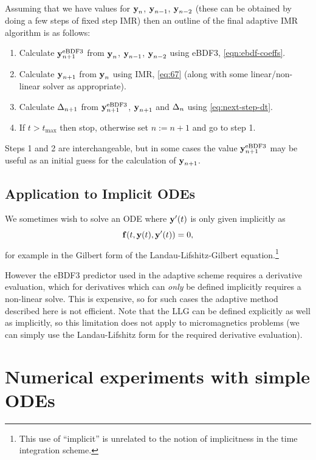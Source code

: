 Assuming that we have values for $\boldsymbol{\mathrm{y}}_n$, $\boldsymbol{\mathrm{y}}_{n-1}$, $\boldsymbol{\mathrm{y}}_{n-2}$ (these can be obtained \eg by doing a few steps of fixed step IMR) then an outline of the final adaptive IMR algorithm is as follows:
\begin{enumerate}
\item Calculate $\boldsymbol{\mathrm{y}}_{n+1}^{\mathrm{eBDF3}}$ from $\boldsymbol{\mathrm{y}}_n$, $\boldsymbol{\mathrm{y}}_{n-1}$, $\boldsymbol{\mathrm{y}}_{n-2}$ using eBDF3, \cref{eqn:ebdf-coeffs}.
\item Calculate $\boldsymbol{\mathrm{y}}_{n+1}$ from $\boldsymbol{\mathrm{y}}_n$ using IMR, \cref{eq:67} (along with some linear/non-linear solver as appropriate).
\item Calculate $\Delta_{n+1}$ from $\boldsymbol{\mathrm{y}}_{n+1}^{\mathrm{eBDF3}}$, $\boldsymbol{\mathrm{y}}_{n+1}$ and $\Delta_{n}$ using
  \cref{eq:next-step-dt}.
\item If $t > t_{\text{max}}$ then stop, otherwise set $n := n+1$ and go to step 1.
\end{enumerate}

Steps 1 and 2 are interchangeable, but in some cases the value $\boldsymbol{\mathrm{y}}_{n+1}^{\mathrm{eBDF3}}$ may be useful as an initial guess for the calculation of $\boldsymbol{\mathrm{y}}_{n+1}$.


\subsection{Application to Implicit ODEs}
\label{sec:extens-impl-odes}

We sometimes wish to solve an ODE where $\boldsymbol{\mathrm{y}}'(t)$ is only given implicitly as
\begin{equation}
  {\boldsymbol{\mathrm{f}}{\left( t, \boldsymbol{\mathrm{y}}(t), \boldsymbol{\mathrm{y}}'(t) \right)}} = 0,
\end{equation}
for example in the Gilbert form of the Landau-Lifshitz-Gilbert equation.\footnote{This use of ``implicit'' is unrelated to the notion of implicitness in the time integration scheme.}

However the eBDF3 predictor used in the adaptive scheme requires a derivative evaluation, which for derivatives which can \emph{only} be defined implicitly requires a non-linear solve.
This is expensive, so for such cases the adaptive method described here is not efficient.
Note that the LLG can be defined explicitly as well as implicitly, so this limitation does not apply to micromagnetics problems (we can simply use the Landau-Lifshitz form for the required derivative evaluation).


\section{Numerical experiments with simple ODEs}
\label{sec:aimr-testing}


